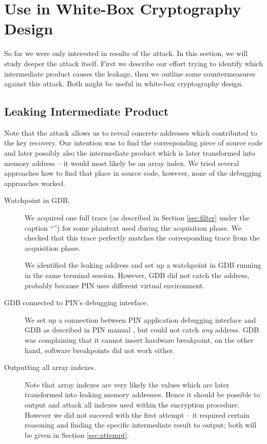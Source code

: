 \section{Use in White-Box Cryptography Design}
\label{sec:useindesign}

So far we were only interested in results of the attack. In this section, we will study deeper the attack itself. First we describe our effort trying to identify which intermediate product causes the leakage, then we outline some countermeasures against this attack. Both might be useful in white-box cryptography design.



\subsection{Leaking Intermediate Product}

Note that the attack allows us to reveal concrete addresses which contributed to the key recovery. Our intention was to find the corresponding piece of source code and later possibly also the intermediate product which is later transformed into memory address -- it would most likely be an array index. We tried several approaches how to find that place in source code, however, none of the debugging approaches worked.

\begin{description}
	\item[Watchpoint in GDB.]
		We acquired one full trace (as described in Section \ref{sec:filter} under the caption ``\AddrTempFilter'') for some plaintext used during the acquisition phase. We checked that this trace perfectly matches the corresponding trace from the acquisition phase.
		
		We identified the leaking address and set up a watchpoint in GDB running in the same terminal session. However, GDB did not catch the address, probably because PIN uses different virtual environment.
	\item[GDB connected to PIN's debugging interface.]
		We set up a connection between PIN application debugging interface and GDB as described in PIN manual \cite{pin214manual}, but could not catch {\em any} address. GDB was complaining that it cannot insert hardware breakpoint, on the other hand, software breakpoints did not work either.
	\item[Outputting all array indexes.]
		Note that array indexes are very likely the values which are later transformed into leaking memory addresses. Hence it should be possible to output and attack all indexes used within the encryption procedure. However we did not succeed with the first attempt -- it required certain reasoning and finding the specific intermediate result to output; both will be given in Section \ref{sec:attempt}.
\end{description}

